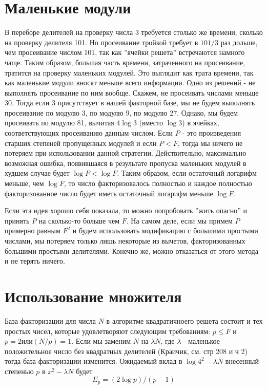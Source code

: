 \documentclass[russian, utf8, a4paper,12pt]{report}
\begin{document}
\section{Маленькие модули}
В переборе делителей на проверку числа 3 требуется столько же времени, сколько на проверку делителя 101. Но просеивание тройкой требует в $101/3$ раз дольше, чем просеивание числом 101, так как ''ячейки решета'' встречаются намного чаще. Таким образом, большая часть времени, затраченного на просеивание, тратится на проверку маленьких модулей. Это выглядит как трата времени, так как маленькие модули вносят меньше всего информации. Одно из решений - не выполнять просеивание по ним вообще. Скажем, не просеивать числами меньше 30. Тогда если 3 присутствует в нашей факторной базе, мы не будем выполнять просеивание по модулю 3, по модулю 9, по модулю 27. Однако, мы будем просеивать по модулю 81, вычитая $4\log{3}$ (вместо $\log{3}$) в ячейках, соответствующих просеиванию данным числом. Если $P$ - это произведения старших степеней пропущенных модулей и если $P < F$, тогда мы ничего не потеряем при использовании данной стратегии. Действительно, максимально возможная ошибка, появившаяся в результате пропуска маленьких модулей в худшем случае будет $\log{P} < \log{F}$. Таким образом, если остаточный логарифм меньше, чем $\log{F}$, то число факторизовалось полностью и каждое полностью факторизованное число будет иметь остаточный логарифм меньше $\log{F}$.

Если эта идея хорошо себя показала, то можно попробовать ''жить опасно'' и принять $P$ на сколько-то больше чем $F$. На самом деле, если мы примем $P$ примерно равным $F^2$ и будем использовать модификацию с большими простыми числами, мы потеряем только лишь некоторые из вычетов, факторизованных большими простыми делителями. Конечно же, можно отказаться от этого метода и не терять ничего.

\section{Использование множителя}
База факторизации для числа $N$ в алгоритме квадратичноего решета состоит и тех простых чисел, которые удовлетворяют следующим требованиям: $p \leq F$ и $p = 2 или (N/p) = 1$. Если мы заменим $N$ на $\lambda N$, где $\lambda$ - маленькое положительное число без квадратных делителей (Краичик, см. \cite{krai} стр 208 и \cite{krai2} ч 2) тогда база факторизации изменится. Ожидаемый вклад в $\log{4^2 - \lambda N}$ внесенный степенью $p$ в $x^2 - \lambda N$ будет
\begin{equation*}
E_p = (2 \log{p})/(p-1) 
\end{equation*}
\end{document}
